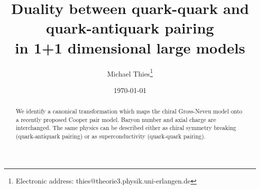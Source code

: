 \documentclass[a4paper,twocolumn,aps]{revtex4}
\begin{document}
 
\title{Duality between quark-quark and quark-antiquark pairing \\ in 1+1 dimensional large \coordHE{} models}  
\author{Michael Thies\footnote{Electronic address: thies@theorie3.physik.uni-erlangen.de}} 
\address{Institut f\"ur Theoretische Physik III\\ 
Universit\"at Erlangen-N\"urnberg\\ 
Staudtstra\ss e 7\\ 
D-91058 Erlangen\\ 
Germany} 
\date{\today} 
\begin{abstract}
We identify a canonical transformation which maps the chiral Gross-Neveu model onto a recently
proposed Cooper pair model. Baryon number and axial charge are interchanged. The same physics
can be described either as chiral symmetry breaking (quark-antiquark pairing) or as superconductivity
(quark-quark pairing).
\end{abstract} 

\maketitle 
\end{document}
